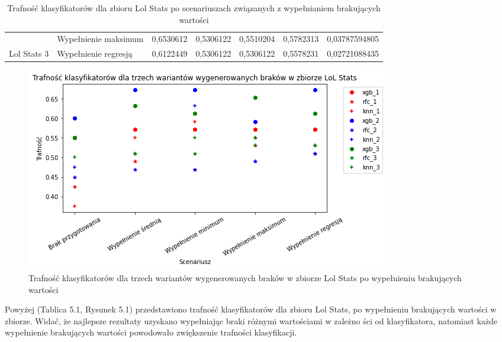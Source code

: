 \documentclass{book}
\begin{document}
\begin{table}[H]
\begin{tabular}{|l|l|r|r|r|r|r|}
                                  & Wypełnienie maksimum & \cellcolor[HTML]{67FD9A}0,6530612                                                & 0,5306122                                                                                & \cellcolor[HTML]{67FD9A}0,5510204                                                                  & \cellcolor[HTML]{FFCC67}0,5782313                                               & \cellcolor[HTML]{FFCC67}0,03787594805                                            \\ \cline{2-7} 
    \multirow{-5}{*}{Lol Stats 3} & Wypełnienie regresją & 0,6122449                                                                        & 0,5306122                                                                                & 0,5306122                                                                                          & 0,5578231                                                                       & 0,02721088435                                                                    \\ \hline
    \end{tabular}
    \caption{Trafność klasyfikatorów dla zbioru Lol Stats po scenariuszach związanych z wypełnianiem brakujących wartości}
    \end{table}


                \begin{figure}[H]
                    \centerline{\includegraphics[scale=0.8]{Lol_stats_Wypełnienie_brakujących}}
                    \centering
                    \caption{Trafność klasyfikatorów dla trzech wariantów wygenerowanych braków w zbiorze Lol Stats po wypełnieniu brakujących wartości}
                    \end{figure}


Powyżej (Tablica 5.1, Rysunek 5.1) przedstawiono 
trafność klasyfikatorów dla zbioru Lol Stats, 
po wypełnieniu brakujących wartości w zbiorze.
Widać, że najlepsze rezultaty uzyskano wypełniając
braki różnymi wartościami w zależno ści od klasyfikatora,
natomiast każde wypełnienie brakujących wartości powodowało
zwiększenie trafności klasyfikacji.
\end{document}
